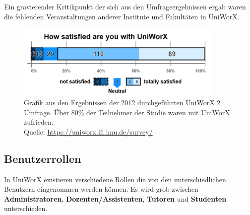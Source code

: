 \documentclass[11pt,a4paper,twoside,ngerman]{article}
\begin{document}
Ein gravierender Kritikpunkt der sich aus den Umfrageergebnissen ergab waren die fehlenden Veranstaltungen anderer Institute und Fakultäten in UniWorX.

\begin{figure}[h]
    \centering
    \includegraphics[width=10cm]{images/uniworx_satisfaction.png}
    \caption{Grafik aus den Ergebnissen der 2012 durchgeführten UniWorX 2 Umfrage. Über 80\% der Teilnehmer der Studie waren mit UniWorX zufrieden. \\ Quelle: \url{https://uniworx.ifi.lmu.de/survey/}}
    \label{fig:uniworx_satisfaction}
\end{figure}

\subsection{Benutzerrollen} \label{sec:uniworx_users}
In UniWorX existieren verschiedene Rollen die von den unterschiedlichen Benutzern eingenommen werden können. Es wird grob zwischen \textbf{Administratoren}, \textbf{Dozenten/Assistenten}, \textbf{Tutoren} und \textbf{Studenten} unterschieden.
\end{document}
